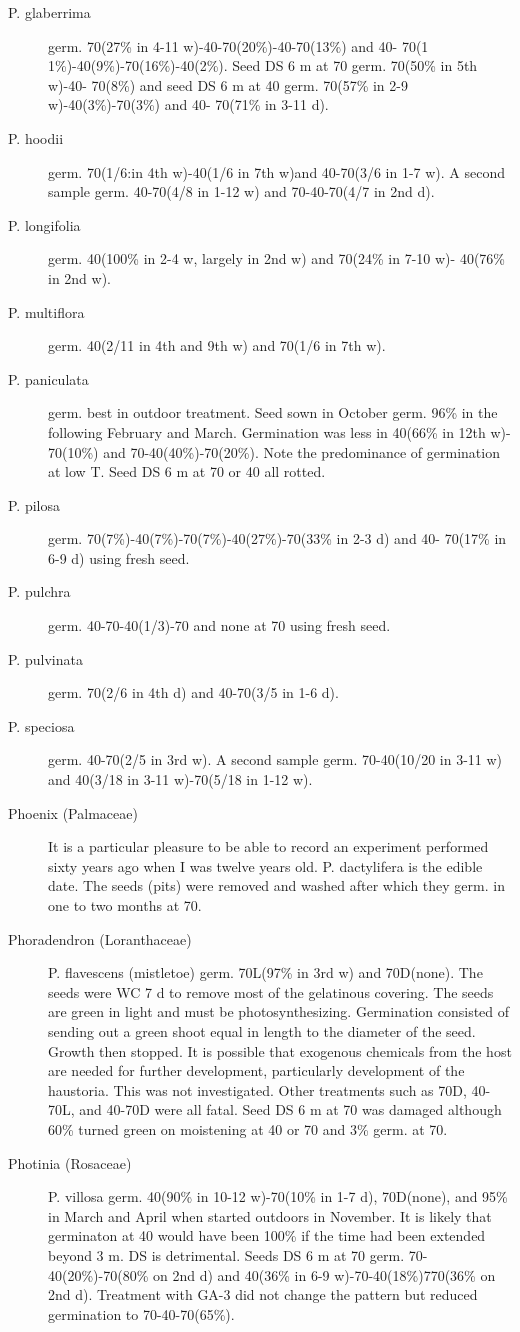 \begin{description}
\item[P. glaberrima] germ. 70(27\% in 4-11 w)-40-70(20\%)-40-70(13\%) and 40-
70(1 1\%)-40(9\%)-70(16\%)-40(2\%). Seed DS 6 m at 70 germ. 70(50\% in 5th w)-40-
70(8\%) and seed DS 6 m at 40 germ. 70(57\% in 2-9 w)-40(3\%)-70(3\%) and 40-
70(71\% in 3-11 d).
\item[P. hoodii] germ. 70(1/6:in 4th w)-40(1/6 in 7th w)and 40-70(3/6 in 1-7 w). A
second sample germ. 40-70(4/8 in 1-12 w) and 70-40-70(4/7 in 2nd d).
\item[P. longifolia] germ. 40(100\% in 2-4 w, largely in 2nd w) and 70(24\% in 7-10 w)-
40(76\% in 2nd w).
\item[P. multiflora] germ. 40(2/11 in 4th and 9th w) and 70(1/6 in 7th w).
\item[P. paniculata] germ. best in outdoor treatment. Seed sown in October germ.
96\% in the following February and March. Germination was less in 40(66\% in 12th w)-
70(10\%) and 70-40(40\%)-70(20\%). Note the predominance of germination at low T.
Seed DS 6 m at 70 or 40 all rotted.
\item[P. pilosa] germ. 70(7\%)-40(7\%)-70(7\%)-40(27\%)-70(33\% in 2-3 d) and 40-
70(17\% in 6-9 d) using fresh seed.
\item[P. pulchra] germ. 40-70-40(1/3)-70 and none at 70 using fresh seed.
\item[P. pulvinata] germ. 70(2/6 in 4th d) and 40-70(3/5 in 1-6 d).
\item[P. speciosa] germ. 40-70(2/5 in 3rd w). A second sample germ. 70-40(10/20 in
3-11 w) and 40(3/18 in 3-11 w)-70(5/18 in 1-12 w).

\item[Phoenix (Palmaceae)] It is a particular pleasure to be able to record an
experiment performed sixty years ago when I was twelve years old. P. dactylifera is
the edible date. The seeds (pits) were removed and washed after which they germ. in
one to two months at 70.
\item[Phoradendron (Loranthaceae)] P. flavescens (mistletoe) germ. 70L(97\%
in 3rd w) and 70D(none). The seeds were WC 7 d to remove most of the gelatinous
covering. The seeds are green in light and must be photosynthesizing. Germination
consisted of sending out a green shoot equal in length to the diameter of the seed.
Growth then stopped. It is possible that exogenous chemicals from the host are
needed for further development, particularly development of the haustoria. This was
not investigated. Other treatments such as 70D, 40-70L, and 40-70D were all fatal.
Seed DS 6 m at 70 was damaged although 60\% turned green on moistening at 40 or
70 and 3\% germ. at 70.
\item[Photinia (Rosaceae)] P. villosa germ. 40(90\% in 10-12 w)-70(10\% in 1-7 d),
70D(none), and 95\% in March and April when started outdoors in November. It is
likely that germinaton at 40 would have been 100\% if the time had been extended
beyond 3 m. DS is detrimental. Seeds DS 6 m at 70 germ. 70-40(20\%)-70(80\% on
2nd d) and 40(36\% in 6-9 w)-70-40(18\%)770(36\% on 2nd d). Treatment with GA-3 did
not change the pattern but reduced germination to 70-40-70(65\%).


\end{description}
